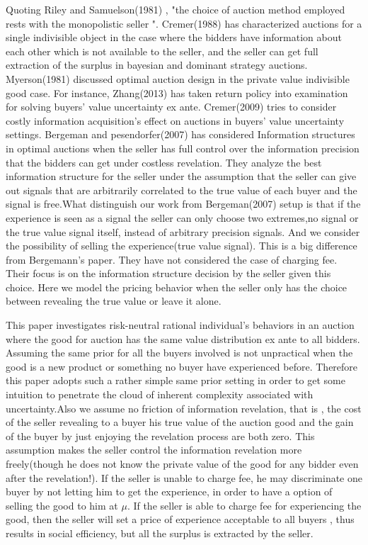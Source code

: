 \documentclass[review]{elsarticle}
\begin{document}
 Quoting Riley  and  Samuelson(1981)\cite{Samuelson81} ,  "the
choice  of  auction  method  employed  rests  with the  monopolistic
seller ". Cremer(1988)\cite{Jacques88} has characterized
auctions  for  a single  indivisible  object  in the  case  where  the
bidders  have information  about  each  other  which  is not available  to the  seller, and the seller can get full  extraction  of  the  surplus  in bayesian  and
dominant  strategy  auctions. Myerson(1981)\cite{Myerson81} discussed
optimal auction design in the private value indivisible good
case. For instance,  Zhang(2013)\cite{Jun13} has taken
return policy into examination for solving buyers' value uncertainty
ex ante.  Cremer(2009)\cite{Jacques09} tries to consider
costly information acquisition's effect on auctions in buyers' value
uncertainty settings. Bergeman and pesendorfer(2007)\cite{Bergemann07}
has considered Information structures in optimal auctions when the
seller has full control over the information precision that the
bidders can get under costless revelation. They analyze the best
information structure for the seller under the  assumption that the seller
can give out signals that are arbitrarily correlated to the true value
of each buyer and the signal is free.What distinguish our work from Bergeman(2007)\cite{Bergemann07} setup is
 that if the experience is seen as a signal the
seller can only choose two extremes,no signal or the true
value signal itself, instead of arbitrary precision signals. And we consider the possibility of selling the experience(true value signal).
This is a big difference from Bergemann\cite{Bergemann07}'s paper. They have not considered the case of charging fee. Their focus is on the information structure decision 
by the seller given this choice. Here we model the pricing behavior when the seller only has the choice between revealing the true value or leave it alone.

This paper investigates risk-neutral rational individual's behaviors in an auction where the good for auction has the same value distribution ex ante to all bidders. Assuming the same prior for all the buyers involved is not unpractical when the good is a new product or something no buyer have experienced before.
Therefore this paper adopts such a rather simple same prior setting in order to get some intuition to penetrate the cloud of inherent complexity associated with uncertainty.Also we assume no friction of information revelation, that is , the cost of the seller revealing to a buyer his true value of the auction good and the gain of the buyer by just enjoying the revelation process are both zero. 
This assumption makes the seller control the information revelation more freely(though he does not know the private value of the good for any bidder even after the revelation!).
If the seller is unable to charge fee, he may discriminate one buyer by not letting him to get the experience, in order to have a option of selling the good to him at $\mu$. If the seller is able to charge fee for experiencing the good, then the seller
will set a price of experience acceptable to all buyers , thus results in social efficiency, but all the surplus is extracted by the seller.
\end{document}
